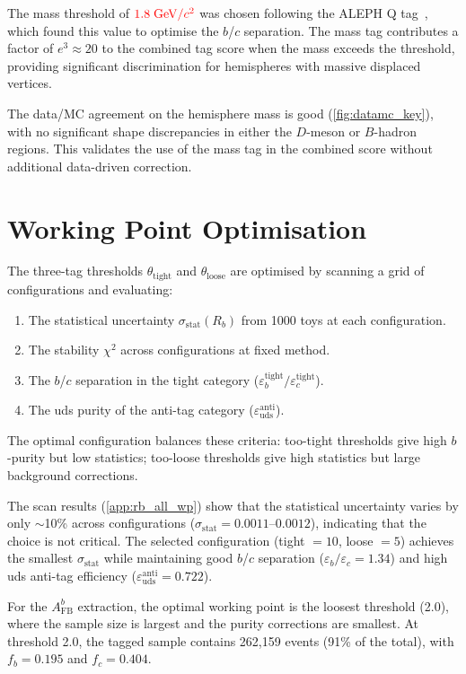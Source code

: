 \documentclass[11pt,a4paper]{article}
\newcommand{\external}[1]{\textcolor{red}{#1}}
\begin{document}
The mass threshold of $\external{1.8\;\text{GeV}/c^2}$ was chosen
following the ALEPH Q tag~\cite{ALEPH:Rb:1996}, which found this
value to optimise the $b$/$c$ separation.
The mass tag contributes a factor of $e^3 \approx 20$ to the
combined tag score when the mass exceeds the threshold, providing
significant discrimination for hemispheres with massive displaced
vertices.

The data/MC agreement on the hemisphere mass is good
(\cref{fig:datamc_key}), with no significant shape discrepancies
in either the $D$-meson or $B$-hadron regions.
This validates the use of the mass tag in the combined score
without additional data-driven correction.

\section{Working Point Optimisation}
\label{app:wp_optimisation}

The three-tag thresholds $\theta_\text{tight}$ and
$\theta_\text{loose}$ are optimised by scanning a grid of
configurations and evaluating:
\begin{enumerate}
\item The statistical uncertainty $\sigma_\text{stat}(R_b)$ from
  1000 toys at each configuration.
\item The stability $\chi^2$ across configurations at fixed
  method.
\item The $b$/$c$ separation in the tight category
  ($\varepsilon_b^\text{tight} / \varepsilon_c^\text{tight}$).
\item The uds purity of the anti-tag category
  ($\varepsilon_\text{uds}^\text{anti}$).
\end{enumerate}

The optimal configuration balances these criteria: too-tight
thresholds give high $b$-purity but low statistics; too-loose
thresholds give high statistics but large background corrections.

The scan results (\cref{app:rb_all_wp}) show that the statistical
uncertainty varies by only $\sim$10\% across configurations
($\sigma_\text{stat} = 0.0011$--$0.0012$), indicating that the
choice is not critical.
The selected configuration (tight $= 10$, loose $= 5$) achieves
the smallest $\sigma_\text{stat}$ while maintaining good
$b$/$c$ separation ($\varepsilon_b/\varepsilon_c = 1.34$) and
high uds anti-tag efficiency ($\varepsilon_\text{uds}^\text{anti}
= 0.722$).

For the $A_\text{FB}^b$ extraction, the optimal working point is
the loosest threshold (2.0), where the sample size is largest
and the purity corrections are smallest.
At threshold 2.0, the tagged sample contains 262,159 events
(91\% of the total), with $f_b = 0.195$ and
$f_c = 0.404$.
\end{document}
